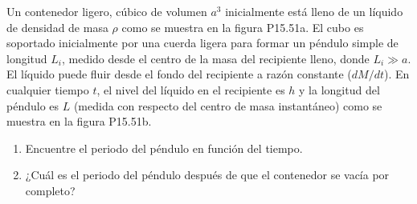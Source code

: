\item Un contenedor ligero, cúbico de volumen $a^3$ inicialmente está lleno de un líquido de densidad de masa $\rho$ como se muestra en la figura P15.51a. El cubo es soportado inicialmente por una cuerda ligera para formar un péndulo simple de longitud $L_i$, medido desde el centro de la masa del recipiente lleno, donde $L_i \gg a$. El líquido puede fluir desde el fondo del recipiente a razón constante ($dM/dt$). En cualquier tiempo $t$, el nivel del líquido en el recipiente es $h$ y la longitud del péndulo es $L$ (medida con respecto del centro de masa instantáneo) como se muestra en la figura P15.51b.
\begin{enumerate}
    \item Encuentre el periodo del péndulo en función del tiempo.
    \item ¿Cuál es el periodo del péndulo después de que el contenedor se vacía por completo?
\end{enumerate}